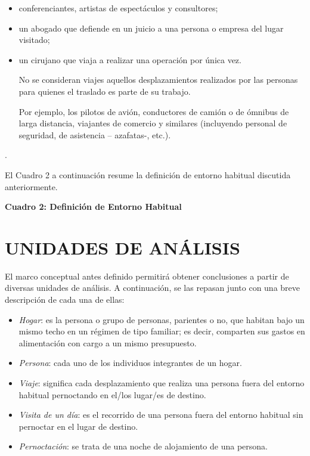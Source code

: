 \documentclass[
  openany]{book}
\begin{document}
{  \begin{itemize}
  \item
    conferenciantes, artistas de espectáculos y consultores;\\
  \item
    un abogado que defiende en un juicio a una persona o empresa del lugar visitado;
  \item
    un cirujano que viaja a realizar una operación por única vez.

    No se consideran viajes aquellos desplazamientos realizados por las personas para quienes el traslado es parte de su trabajo.

    Por ejemplo, los pilotos de avión, conductores de camión o de ómnibus de larga distancia, viajantes de comercio y similares (incluyendo personal de seguridad, de asistencia -- azafatas-, etc.).
  \end{itemize}}.

El Cuadro 2 a continuación resume la definición de entorno habitual discutida anteriormente.

\textbf{Cuadro 2: Definición de Entorno Habitual}

\hypertarget{unidades-de-anuxe1lisis}{%
\section{\texorpdfstring{\textbf{UNIDADES DE ANÁLISIS}}{UNIDADES DE ANÁLISIS}}\label{unidades-de-anuxe1lisis}}

El marco conceptual antes definido permitirá obtener conclusiones a partir de diversas unidades de análisis.
A continuación, se las repasan junto con una breve descripción de cada una de ellas:

\begin{itemize}
\item
  \emph{Hogar}: es la persona o grupo de personas, parientes o no, que habitan bajo un mismo techo en un régimen de tipo familiar; es decir, comparten sus gastos en alimentación con cargo a un mismo presupuesto.
\item
  \emph{Persona}: cada uno de los individuos integrantes de un hogar.
\item
  \emph{Viaje}: significa cada desplazamiento que realiza una persona fuera del entorno habitual pernoctando en el/los lugar/es de destino.
\item
  \emph{Visita de un día}: es el recorrido de una persona fuera del entorno habitual sin pernoctar en el lugar de destino.
\item
  \emph{Pernoctación}: se trata de una noche de alojamiento de una persona.
\end{itemize}
\end{document}
